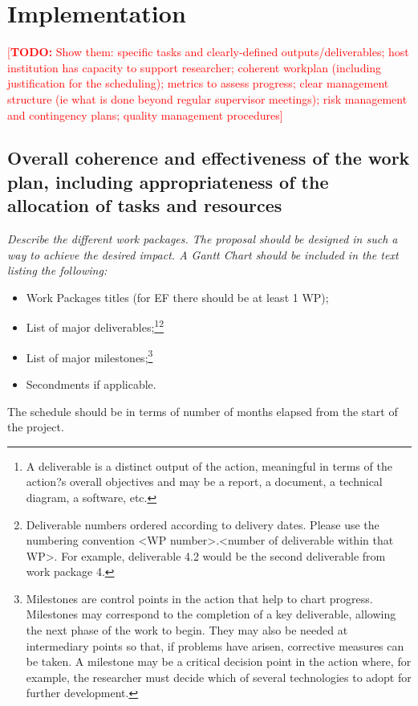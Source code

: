 \documentclass[a4paper,11pt]{article}
\newcommand{\TODO}[1]{{\textcolor{red}{[\textbf{TODO:} #1]}}}
\begin{document}
\section{Implementation}
\label{sec:implementation}

\TODO{Show them: specific tasks and clearly-defined outputs/deliverables; host institution has capacity to support researcher; coherent workplan (including justification for the scheduling); metrics to assess progress; clear management structure (ie what is done beyond regular supervisor meetings); risk management and contingency plans; quality management procedures}

\subsection{Overall coherence and effectiveness of the work plan, including appropriateness of the allocation of tasks and resources}

{\em
Describe the different work packages. The proposal should be designed in such a way to achieve the desired impact. A Gantt Chart should be included in the text listing the following:
\begin{itemize}
\item Work Packages titles (for EF there should be at least 1 WP);
\item List of major deliverables;\footnote{A deliverable is a distinct output of the action, meaningful in terms of the action?s overall objectives and may be a report, a document, a technical diagram, a software, etc.}\footnote{Deliverable numbers ordered according to delivery dates. Please use the numbering convention <WP number>.<number of deliverable within that WP>. For example, deliverable 4.2 would be the second deliverable from work package 4.}
\item List of major milestones;\footnote{Milestones are control points in the action that help to chart progress. Milestones may correspond to the completion of a key deliverable, allowing the next phase of the work to begin. They may also be needed at intermediary points so that, if problems have arisen, corrective measures can be taken. A milestone may be a critical decision point in the action where, for example, the researcher must decide which of several technologies to adopt for further development.}
\item Secondments if applicable.
\end{itemize}
The schedule should be in terms of number of months elapsed from the start of the project.
}
\end{document}
